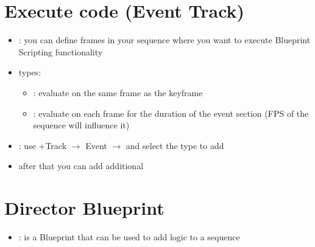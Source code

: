         \section{Execute code (Event Track)}
            \begin{itemize}
                \item {} : you can define frames in your sequence where you want to execute Blueprint Scripting functionality
                \item types:
                    \begin{itemize}
                        \item {} : evaluate on the same frame as the keyframe
                        \item {} : evaluate on each frame for the duration of the event section (FPS of the sequence will influence it)
                    \end{itemize}
                \item {} : use +Track $\rightarrow$ Event $\rightarrow$ and select the type to add
                \item after that you can add additional 
            \end{itemize}

        \section{Director Blueprint}
            \begin{itemize}
                \item {} : is a Blueprint that can be used to add logic to a sequence
            \end{itemize}

